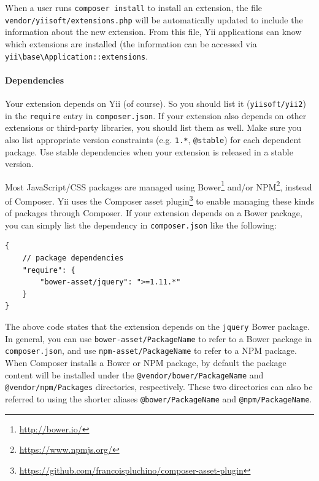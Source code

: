 When a user runs \lstinline|composer install| to install an extension, the file \lstinline|vendor/yiisoft/extensions.php|
will be automatically updated to include the information about the new extension. From this file, Yii applications
can know which extensions are installed (the information can be accessed via \texttt{yii{\allowbreak{}\textbackslash}base{\allowbreak{}\textbackslash}Application\allowbreak{}::\allowbreak{}extensions}.

\paragraph{Dependencies \label{structure-extensions.md::dependencies}}
Your extension depends on Yii (of course). So you should list it (\lstinline|yiisoft/yii2|) in the \lstinline|require| entry in \lstinline|composer.json|.
If your extension also depends on other extensions or third-party libraries, you should list them as well.
Make sure you also list appropriate version constraints (e.g. \lstinline|1.*|, \lstinline|@stable|) for each dependent package. Use stable
dependencies when your extension is released in a stable version.

Most JavaScript/CSS packages are managed using Bower\footnote{\url{http://bower.io/}} and/or NPM\footnote{\url{https://www.npmjs.org/}},
instead of Composer. Yii uses the Composer asset plugin\footnote{\url{https://github.com/francoispluchino/composer-asset-plugin}}
to enable managing these kinds of packages through Composer. If your extension depends on a Bower package, you can
simply list the dependency in \lstinline|composer.json| like the following:

\lstset{language=json}\begin{lstlisting}
{
    // package dependencies
    "require": {
        "bower-asset/jquery": ">=1.11.*"
    }
}
\end{lstlisting}
The above code states that the extension depends on the \lstinline|jquery| Bower package. In general, you can use
\lstinline|bower-asset/PackageName| to refer to a Bower package in \lstinline|composer.json|, and use \lstinline|npm-asset/PackageName|
to refer to a NPM package. When Composer installs a Bower or NPM package, by default the package content will be
installed under the \lstinline|@vendor/bower/PackageName| and \lstinline|@vendor/npm/Packages| directories, respectively.
These two directories can also be referred to using the shorter aliases \lstinline|@bower/PackageName| and \lstinline|@npm/PackageName|.

